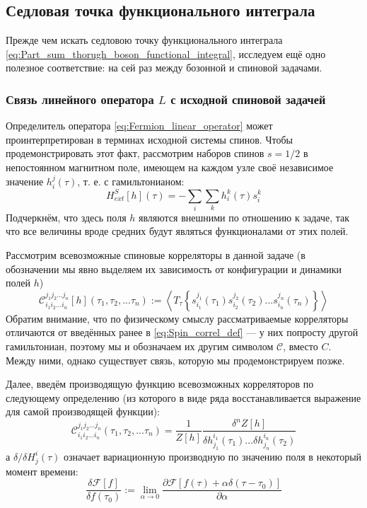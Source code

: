 \subsection{Седловая точка функционального интеграла}
Прежде чем искать седловою точку функционального интеграла \eqref{eq:Part_sum_thorugh_boson_functional_integral}, исследуем ещё одно полезное соответствие: на сей раз между бозонной и спиновой задачами.

\subsubsection{Связь линейного оператора $L$ с исходной спиновой задачей}
Определитель оператора \eqref{eq:Fermion_linear_operator} может проинтерпретирован в терминах исходной системы спинов. Чтобы продемонстрировать этот факт, рассмотрим наборов спинов $s = 1/2$ в непостоянном магнитном поле, имеющем на каждом узле своё независимое значение $h^j_i(\tau)$, т. е. с гамильтонианом:
\begin{equation}
	\label{eq:Time_dependent_spin_hamiltonian}
	H^S_{ext}[h](\tau) = - \sum_i \sum_k h^k_i (\tau) s^k_i
\end{equation}
Подчеркнём, что здесь поля $h$ являются внешними по отношению к задаче, так что все величины вроде средних будут являться функционалами от этих полей.

Рассмотрим всевозможные спиновые корреляторы в данной задаче (в обозначении мы явно выделяем их зависимость от конфигурации и динамики полей $h$)
\begin{equation}
	\label{eq:Field_dependent_spin_correlators_definition}
	\mathcal{C}^{j_1 j_2 ... j_n}_{i_1 i_2 ... i_n}[h] \left( \tau_1, \tau_2, ... \tau_n \right) := \left\langle T_\tau\left\{ s^{j_1}_{i_1}(\tau_1) s^{j_2}_{i_2}(\tau_2) ... s^{j_n}_{i_n}(\tau_n) \right\} \right\rangle
\end{equation}
Обратим внимание, что по физическому смыслу рассматриваемые корреляторы отличаются от введённых ранее в \eqref{eq:Spin_correl_def} --- у них попросту другой гамильтониан, поэтому мы и обозначаем их другим символом $\mathcal{C}$, вместо $C$. Между ними, однако существует связь, которую мы продемонстрируем позже.

Далее, введём производящую функцию всевозможных корреляторов по следующему определению (из которого в виде ряда восстанавливается выражение для самой производящей функции):
\begin{equation}
	\label{eq:Field_dependent_spin_correlators_generating_function}
	\mathcal{C}^{j_1 j_2 ... j_n}_{i_1 i_2 ... i_n} \left( \tau_1, \tau_2, ... \tau_n \right) = \frac{1}{Z[h]} \frac{\delta^n Z[h] }{\delta h^{i_1}_{j_1}(\tau_1) ... \delta h^{i_n}_{j_n}(\tau_2) }
\end{equation}
а $\delta / \delta H^{i}_{j}(\tau)$ означает вариационную производную по значению поля в некоторый момент времени:
$$
\frac{ \delta \mathcal{F}[f] }{ \delta f(\tau_0) } := \lim_{\alpha \rightarrow 0} \frac{\partial \mathcal{F} \left[f(\tau) + \alpha \delta(\tau - \tau_0) \right] }{\partial \alpha}
$$

